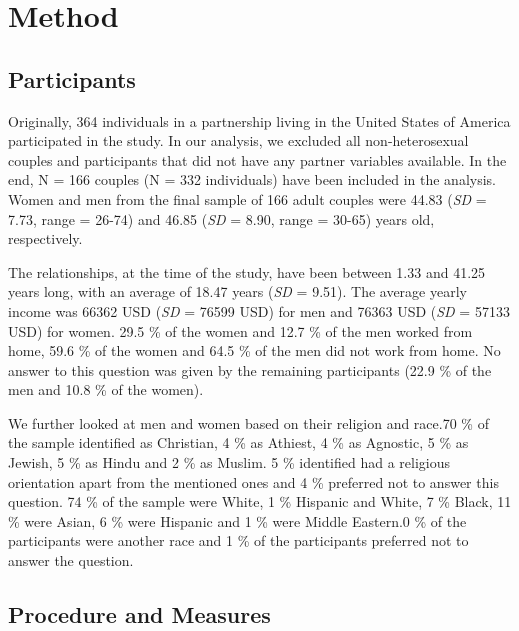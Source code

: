\documentclass[
  man,floatsintext]{apa6}
\begin{document}
\hypertarget{method}{%
\section{Method}\label{method}}

\hypertarget{participants}{%
\subsection{Participants}\label{participants}}

Originally, 364 individuals in a partnership living in the United States of America participated in the study. In our analysis, we excluded all non-heterosexual couples and participants that did not have any partner variables available. In the end, N = 166 couples (N = 332 individuals) have been included in the analysis. Women and men from the final sample of 166 adult couples were 44.83 (\emph{SD} = 7.73, range = 26-74) and 46.85 (\emph{SD} = 8.90, range = 30-65) years old, respectively.

The relationships, at the time of the study, have been between 1.33 and 41.25 years long, with an average of 18.47 years (\emph{SD} = 9.51). The average yearly income was 66362 USD (\emph{SD} = 76599 USD) for men and 76363 USD (\emph{SD} = 57133 USD) for women. 29.5 \% of the women and 12.7 \% of the men worked from home, 59.6 \% of the women and 64.5 \% of the men did not work from home. No answer to this question was given by the remaining participants (22.9 \% of the men and 10.8 \% of the women).

We further looked at men and women based on their religion and race.70 \% of the sample identified as Christian, 4 \% as Athiest, 4 \% as Agnostic, 5 \% as Jewish, 5 \% as Hindu and 2 \% as Muslim. 5 \% identified had a religious orientation apart from the mentioned ones and 4 \% preferred not to answer this question.
74 \% of the sample were White, 1 \% Hispanic and White, 7 \% Black, 11 \% were Asian, 6 \% were Hispanic and 1 \% were Middle Eastern.0 \% of the participants were another race and 1 \% of the participants preferred not to answer the question.

\hypertarget{procedure-and-measures}{%
\subsection{Procedure and Measures}\label{procedure-and-measures}}
\end{document}
